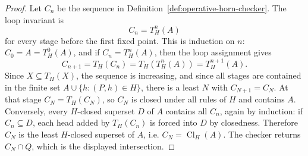 \documentclass[runningheads]{llncs}
\begin{document}
\begin{proof}
Let \(C_n\) be the sequence in
Definition~\ref{def:operative-horn-checker}.  The loop invariant is
\[
C_n=T_H^n(A)
\]
for every stage before the first fixed point.  This is induction on \(n\):
\(C_0=A=T_H^0(A)\), and if \(C_n=T_H^n(A)\), then the loop assignment gives
\[
C_{n+1}=T_H(C_n)=T_H(T_H^n(A))=T_H^{n+1}(A).
\]
Since \(X\subseteq T_H(X)\), the sequence is increasing, and since all stages
are contained in the finite set \(A\cup\{h:(P,h)\in H\}\), there is a least
\(N\) with \(C_{N+1}=C_N\).  At that stage \(C_N=T_H(C_N)\), so \(C_N\) is
closed under all rules of \(H\) and contains \(A\).  Conversely, every
\(H\)-closed superset \(D\) of \(A\) contains all \(C_n\), again by induction:
if \(C_n\subseteq D\), each head added by \(T_H(C_n)\) is forced into \(D\) by
closedness.  Therefore \(C_N\) is the least \(H\)-closed superset of \(A\), i.e.
\(C_N=\operatorname{Cl}_H(A)\).  The checker returns \(C_N\cap Q\), which is the
displayed intersection.
\end{proof}
\end{document}
